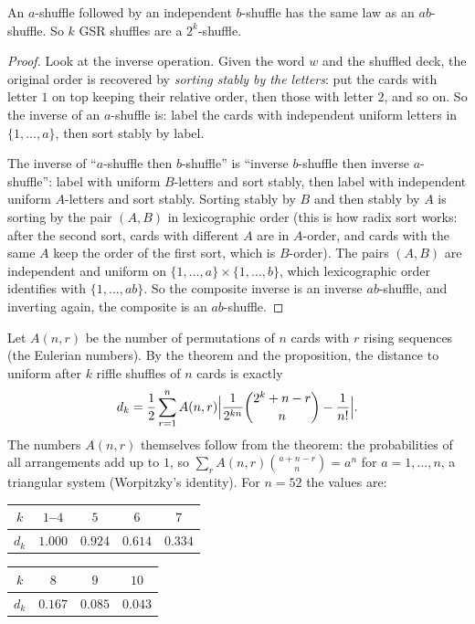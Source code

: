 \begin{proposition}[composition]\label{prop:compose}
An $a$-shuffle followed by an independent $b$-shuffle has the same law as an $ab$-shuffle. So $k$ GSR shuffles are a $2^k$-shuffle.
\end{proposition}
\begin{proof}
Look at the inverse operation. Given the word $w$ and the shuffled deck, the original order is recovered by \emph{sorting stably by the
letters}: put the cards with letter $1$ on top keeping their relative order, then those with letter $2$, and so on. So the inverse of an
$a$-shuffle is: label the cards with independent uniform letters in $\{1,\dots,a\}$, then sort stably by label.

The inverse of ``$a$-shuffle then $b$-shuffle'' is ``inverse $b$-shuffle then inverse $a$-shuffle'': label with uniform $B$-letters and
sort stably, then label with independent uniform $A$-letters and sort stably. Sorting stably by $B$ and then stably by $A$ is sorting
by the pair $(A,B)$ in lexicographic order (this is how radix sort works: after the second sort, cards with different $A$ are in $A$-order, and
cards with the same $A$ keep the order of the first sort, which is $B$-order). The pairs $(A,B)$ are independent and uniform on
$\{1,\dots,a\}\times\{1,\dots,b\}$, which lexicographic order identifies with $\{1,\dots,ab\}$. So the composite inverse is an inverse $ab$-shuffle, and
inverting again, the composite is an $ab$-shuffle.
\end{proof}

Let $A(n,r)$ be the number of permutations of $n$ cards with $r$ rising sequences (the Eulerian numbers). By the theorem and the
proposition, the distance to uniform after $k$ riffle shuffles of $n$ cards is exactly
\[
d_k=\frac12\sum_{r=1}^nA(n,r)\Bigl|\frac1{2^{kn}}\binom{2^k+n-r}n-\frac1{n!}\Bigr|.
\]
The numbers $A(n,r)$ themselves follow from the theorem: the probabilities of all arrangements add up to $1$, so $\sum_rA(n,r)\binom{a+n-r}n=a^n$
for $a=1,\dots,n$, a triangular system (Worpitzky's identity). For $n=52$ the values are:

\begin{center}
\begin{tabular}{c|cccc}
$k$&$1$--$4$&$5$&$6$&$7$\\\hline
$d_k$&$1.000$&$0.924$&$0.614$&$0.334$
\end{tabular}
\qquad
\begin{tabular}{c|ccc}
$k$&$8$&$9$&$10$\\\hline
$d_k$&$0.167$&$0.085$&$0.043$
\end{tabular}
\end{center}

